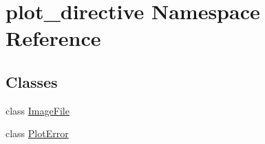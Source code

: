 \hypertarget{namespaceplot__directive}{}\section{plot\+\_\+directive Namespace Reference}
\label{namespaceplot__directive}
\subsection*{Classes}
\begin{DoxyCompactItemize}
\item 
class \mbox{\hyperlink{classplot__directive_1_1ImageFile}{Image\+File}}
\item 
class \mbox{\hyperlink{classplot__directive_1_1PlotError}{Plot\+Error}}
\end{DoxyCompactItemize}
